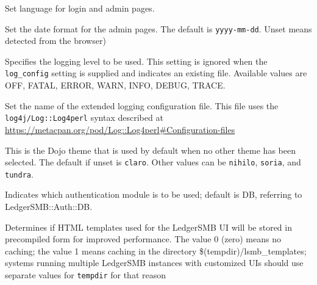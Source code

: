 \begin{description}[style=nextline]
        \item[language] Set language for login and admin pages. 
        \item[date\_format] Set the date format for the admin pages.  The default is \texttt{yyyy-mm-dd}. Unset means detected from the browser)
        \item[log\_level] Specifies the logging level to be used. This setting is ignored when the \texttt{log\_config} setting 
        is supplied and indicates an existing file. Available values are OFF, FATAL, ERROR, WARN, INFO, DEBUG, TRACE.
        \item [log\_config] Set the name of the extended logging configuration file. This file uses the \texttt{log4j/Log::Log4perl} syntax described at \url{https://metacpan.org/pod/Log::Log4perl#Configuration-files}
        \item [dojo\_theme] This is the Dojo theme that is used by default when no other theme
        has been selected.  The default if unset is \texttt{claro}. Other values can be \texttt{nihilo}, \texttt{soria}, and \texttt{tundra}.
        \item[auth] Indicates which authentication module is to be used; default is DB, referring to LedgerSMB::Auth::DB.
        \item[cache\_templates] Determines if HTML templates used for the LedgerSMB UI will be stored
        in precompiled form for improved performance. The value 0 (zero) means no caching; the value
        1 means caching in the directory \$(tempdir)/lsmb\_templates; systems running multiple
        LedgerSMB instances with customized UIs should use separate values for {\tt tempdir} for that
        reason

        
\end{description}

